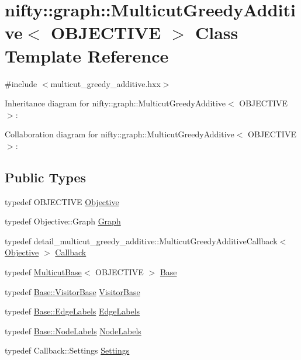 \hypertarget{classnifty_1_1graph_1_1MulticutGreedyAdditive}{}\section{nifty\+:\+:graph\+:\+:Multicut\+Greedy\+Additive$<$ O\+B\+J\+E\+C\+T\+I\+V\+E $>$ Class Template Reference}
\label{classnifty_1_1graph_1_1MulticutGreedyAdditive}


{\ttfamily \#include $<$multicut\+\_\+greedy\+\_\+additive.\+hxx$>$}



Inheritance diagram for nifty\+:\+:graph\+:\+:Multicut\+Greedy\+Additive$<$ O\+B\+J\+E\+C\+T\+I\+V\+E $>$\+:


Collaboration diagram for nifty\+:\+:graph\+:\+:Multicut\+Greedy\+Additive$<$ O\+B\+J\+E\+C\+T\+I\+V\+E $>$\+:
\subsection*{Public Types}
\begin{DoxyCompactItemize}
\item 
typedef O\+B\+J\+E\+C\+T\+I\+V\+E \hyperlink{classnifty_1_1graph_1_1MulticutGreedyAdditive_a46ff3cae81673292ace3d4d4dd6f3011}{Objective}
\item 
typedef Objective\+::\+Graph \hyperlink{classnifty_1_1graph_1_1MulticutGreedyAdditive_ad473f03139a027ca293bb31cad4c4687}{Graph}
\item 
typedef detail\+\_\+multicut\+\_\+greedy\+\_\+additive\+::\+Multicut\+Greedy\+Additive\+Callback$<$ \hyperlink{classnifty_1_1graph_1_1MulticutGreedyAdditive_a46ff3cae81673292ace3d4d4dd6f3011}{Objective} $>$ \hyperlink{classnifty_1_1graph_1_1MulticutGreedyAdditive_a5079d951379543ca00c28fc14e7d73dd}{Callback}
\item 
typedef \hyperlink{classnifty_1_1graph_1_1MulticutBase}{Multicut\+Base}$<$ O\+B\+J\+E\+C\+T\+I\+V\+E $>$ \hyperlink{classnifty_1_1graph_1_1MulticutGreedyAdditive_ae260038d8c5bcec7a0bfe88733f05cca}{Base}
\item 
typedef \hyperlink{classnifty_1_1graph_1_1MulticutBase_a5882fb69df59d8113f6a81a0dac26eaa}{Base\+::\+Visitor\+Base} \hyperlink{classnifty_1_1graph_1_1MulticutGreedyAdditive_a0110a72175b7ff0b2fa895466ea92737}{Visitor\+Base}
\item 
typedef \hyperlink{classnifty_1_1graph_1_1MulticutBase_aaeefe3c5df81d9c9efffec878cf2fcd7}{Base\+::\+Edge\+Labels} \hyperlink{classnifty_1_1graph_1_1MulticutGreedyAdditive_a55aa2b8b11b45f02ea0e5c8874a39533}{Edge\+Labels}
\item 
typedef \hyperlink{classnifty_1_1graph_1_1MulticutBase_afba61ad2919d0fad20b3745af19309da}{Base\+::\+Node\+Labels} \hyperlink{classnifty_1_1graph_1_1MulticutGreedyAdditive_a7e666246f7000022acfb2dd91474afed}{Node\+Labels}
\item 
typedef Callback\+::\+Settings \hyperlink{classnifty_1_1graph_1_1MulticutGreedyAdditive_ab14192647e24d574c75538087acfd090}{Settings}
\end{DoxyCompactItemize}
